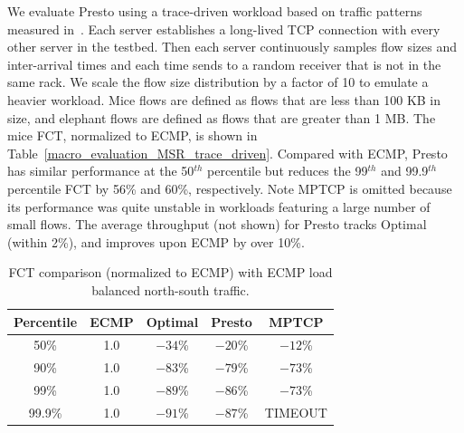 We evaluate Presto using a trace-driven workload based on traffic patterns measured in~\cite{kandula2009nature}. 
Each server establishes a long-lived TCP connection 
with every other server in the testbed. 
Then each server continuously samples flow sizes and inter-arrival times and each time sends to a random receiver
that is not in the same rack.
We scale the flow size distribution by a factor of 10 to emulate a heavier workload. 
Mice flows are defined as flows that are less than 100 KB in size, and elephant flows are defined as flows
that are greater than 1 MB. The mice FCT, normalized to ECMP, 
is shown in Table~\ref{macro_evaluation_MSR_trace_driven}. 
Compared with ECMP, Presto has similar performance at the 50$^{th}$ percentile but reduces the 99$^{th}$ and 99.9$^{th}$ percentile FCT by 56\% and 60\%, respectively. 
Note MPTCP is omitted because its performance was quite unstable in workloads
featuring a large number of small flows.
The average throughput (not shown) for Presto tracks Optimal (within 2\%), and improves upon ECMP by over 10\%.


\begin{table}[!htb]
\begin{center}
\begin{tabular}{ |c|c|c|c|c| }
 \hline

 Percentile & ECMP & Optimal & Presto & MPTCP \\
 \hline
 50\%       & 1.0 & $-34$\%     & $-20$\%   & $-12$\% \\
 90\%       & 1.0 & $-83$\%     & $-79$\%   & $-73$\% \\
 99\%       & 1.0 & $-89$\%     & $-86$\%   & $-73$\% \\
 99.9\%     & 1.0 & $-91$\%      & $-87$\%   & TIMEOUT \\

 \hline
\end{tabular}
\caption{FCT comparison (normalized to ECMP) with ECMP load balanced north-south traffic.}
	\label{macro_evaluation_north_south_traffic}
\end{center}
\end{table}


